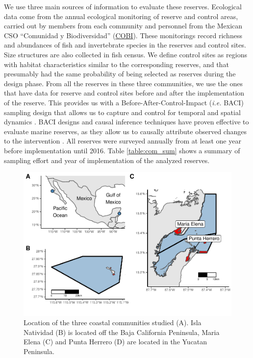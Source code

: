 \documentclass{frontiersSCNS}
\theoremstyle{definition}
\theoremstyle{definition}
\theoremstyle{definition}
\theoremstyle{remark}
\begin{document}
We use three main sources of information to evaluate these reserves.
Ecological data come from the annual ecological monitoring of reserve
and control areas, carried out by members from each community and
personnel from the Mexican CSO ``Comunidad y Biodiversidad''
(\href{www.cobi.org.mx}{COBI}). These monitorings record richness and
abundances of fish and invertebrate species in the reserves and control
sites. Size structures are also collected in fish census. We define
control sites as regions with habitat characteristics similar to the
corresponding reserves, and that presumably had the same probability of
being selected as reserves during the design phase. From all the
reserves in these three communities, we use the ones that have data for
reserve and control sites before and after the implementation of the
reserve. This provides us with a Before-After-Control-Impact
(\emph{i.e.} BACI) sampling design that allows us to capture and control
for temporal and spatial dynamics \citep{depalma_2018,ferraro_2006-oW}.
BACI designs and causal inference techniques have proven effective to
evaluate marine reserves, as they allow us to causally attribute
observed changes to the intervention
\citep{moland_2013-VP,Villasenor-Derbez_2018}. All reserves were
surveyed annually from at least one year before implementation until
2016. Table \ref{table:com_sum} shows a summary of sampling effort and
year of implementation of the analyzed reserves.

\begin{figure}
\centering
\includegraphics{Villasenor-Derbez_files/figure-latex/unnamed-chunk-1-1.pdf}
\caption{\label{fig:unnamed-chunk-1}\label{fig:map}Location of the three
coastal communities studied (A). Isla Natividad (B) is located off the
Baja California Peninsula, Maria Elena (C) and Punta Herrero (D) are
located in the Yucatan Peninsula.}
\end{figure}
\end{document}
